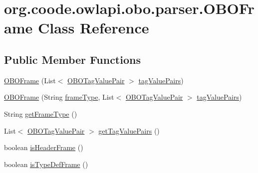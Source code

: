 \hypertarget{classorg_1_1coode_1_1owlapi_1_1obo_1_1parser_1_1_o_b_o_frame}{\section{org.\-coode.\-owlapi.\-obo.\-parser.\-O\-B\-O\-Frame Class Reference}
\label{classorg_1_1coode_1_1owlapi_1_1obo_1_1parser_1_1_o_b_o_frame}
}
\subsection*{Public Member Functions}
\begin{DoxyCompactItemize}
\item 
\hyperlink{classorg_1_1coode_1_1owlapi_1_1obo_1_1parser_1_1_o_b_o_frame_aef0e5d389d9385a407eeaa208eb69e53}{O\-B\-O\-Frame} (List$<$ \hyperlink{classorg_1_1coode_1_1owlapi_1_1obo_1_1parser_1_1_o_b_o_tag_value_pair}{O\-B\-O\-Tag\-Value\-Pair} $>$ \hyperlink{classorg_1_1coode_1_1owlapi_1_1obo_1_1parser_1_1_o_b_o_frame_a3c5893e579b39afc4227b9d6b15cbcff}{tag\-Value\-Pairs})
\item 
\hyperlink{classorg_1_1coode_1_1owlapi_1_1obo_1_1parser_1_1_o_b_o_frame_a897e32f5383f628f72bbd015b1cbfa90}{O\-B\-O\-Frame} (String \hyperlink{classorg_1_1coode_1_1owlapi_1_1obo_1_1parser_1_1_o_b_o_frame_a9ec84cff2d3442a83d8f58d842073d3a}{frame\-Type}, List$<$ \hyperlink{classorg_1_1coode_1_1owlapi_1_1obo_1_1parser_1_1_o_b_o_tag_value_pair}{O\-B\-O\-Tag\-Value\-Pair} $>$ \hyperlink{classorg_1_1coode_1_1owlapi_1_1obo_1_1parser_1_1_o_b_o_frame_a3c5893e579b39afc4227b9d6b15cbcff}{tag\-Value\-Pairs})
\item 
String \hyperlink{classorg_1_1coode_1_1owlapi_1_1obo_1_1parser_1_1_o_b_o_frame_aa00e794c42fd090cff9ae65785d64ede}{get\-Frame\-Type} ()
\item 
List$<$ \hyperlink{classorg_1_1coode_1_1owlapi_1_1obo_1_1parser_1_1_o_b_o_tag_value_pair}{O\-B\-O\-Tag\-Value\-Pair} $>$ \hyperlink{classorg_1_1coode_1_1owlapi_1_1obo_1_1parser_1_1_o_b_o_frame_a8b22146617bc728f74f47ddf2fb88b86}{get\-Tag\-Value\-Pairs} ()
\item 
boolean \hyperlink{classorg_1_1coode_1_1owlapi_1_1obo_1_1parser_1_1_o_b_o_frame_a2b40d7d0f2b42b5b0bb41ccc010da120}{is\-Header\-Frame} ()
\item 
boolean \hyperlink{classorg_1_1coode_1_1owlapi_1_1obo_1_1parser_1_1_o_b_o_frame_a56b424fd16c2723478fc0dac85470ada}{is\-Type\-Def\-Frame} ()
\end{DoxyCompactItemize}
